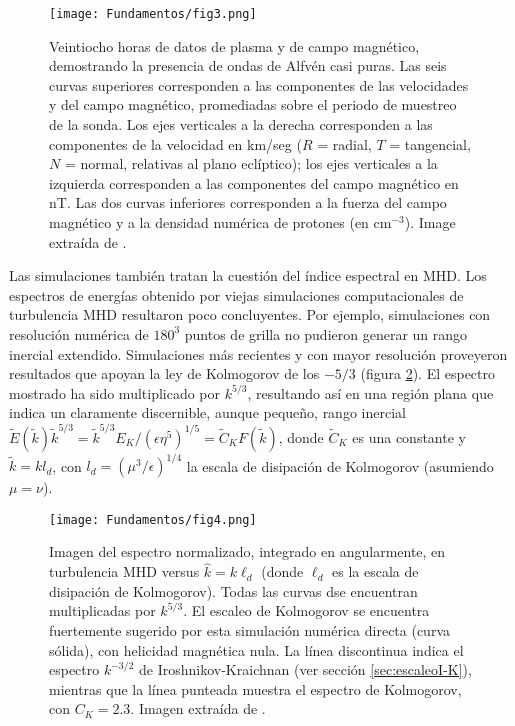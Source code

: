 \begin{figure}[h]
  \centering
  \texttt{[image: Fundamentos/fig3.png]}
  \caption{Veintiocho horas de datos de plasma y de campo magnético,
    demostrando la presencia de ondas de Alfv\'en casi puras. Las seis
    curvas superiores corresponden a las componentes de las
    velocidades y del campo magnético, promediadas sobre el periodo de
    muestreo de la sonda. Los ejes verticales a la derecha
    corresponden a las componentes de la velocidad en km/seg ($R$ =
    radial, $T$ = tangencial, $N$ = normal, relativas al plano
    eclíptico); los ejes verticales a la izquierda corresponden a las
    componentes del campo magnético en nT. Las dos curvas inferiores
    corresponden a la fuerza del campo magnético y a la densidad
    numérica de protones (en cm$^{-3}$). Image extraída de
    \cite{belcher_large-amplitude_1971}.}
  \label{fig:equiparticion}
\end{figure}

Las simulaciones también tratan la cuestión del índice espectral en
MHD. Los espectros de energías obtenido por viejas simulaciones
computacionales de turbulencia MHD resultaron poco concluyentes. Por
ejemplo, simulaciones con resolución numérica de $180^3$ puntos de
grilla \cite{politano_current_1995} no pudieron generar un rango
inercial extendido. Simulaciones más recientes y con mayor resolución
\cite{biskamp_scaling_2000} proveyeron resultados que apoyan la ley de
Kolmogorov de los $-5/3$ (figura \ref{fig:normalizedspectrum}). El
espectro mostrado ha sido multiplicado por $k^{5/3}$, resultando así
en una región plana que indica un claramente discernible, aunque
pequeño, rango inercial $\tilde{E}(\tilde{k})\tilde{k}^{5/3} =
\tilde{k}^{5/3}E_K/\left(\epsilon\eta^5\right)^{1/5} = \tilde{C}_K
F(\tilde{k})$, donde $\tilde{C}_K$ es una constante y
$\tilde{k}=kl_d$, con $l_d=\left(\mu^3/\epsilon\right)^{1/4}$ la
escala de disipación de Kolmogorov (asumiendo $\mu=\nu$).

\begin{figure}[h]
  \centering
  \texttt{[image: Fundamentos/fig4.png]}
  \caption{Imagen del espectro normalizado, integrado en angularmente,
    en turbulencia MHD versus $\hat{k} = k\ell_d$ (donde $\ell_d$ es
    la escala de disipación de Kolmogorov). Todas las curvas dse
    encuentran multiplicadas por $k^{5/3}$. El escaleo de Kolmogorov
    se encuentra fuertemente sugerido por esta simulación numérica
    directa (curva sólida), con helicidad magnética nula. La línea
    discontinua indica el espectro $k^{-3/2}$ de Iroshnikov-Kraichnan
    (ver sección \ref{sec:escaleoI-K}), mientras que la línea punteada
    muestra el espectro de Kolmogorov, con $C_K = 2.3$. Imagen
    extraída de \cite{biskamp_scaling_2000}.}
  \label{fig:normalizedspectrum}
\end{figure}

